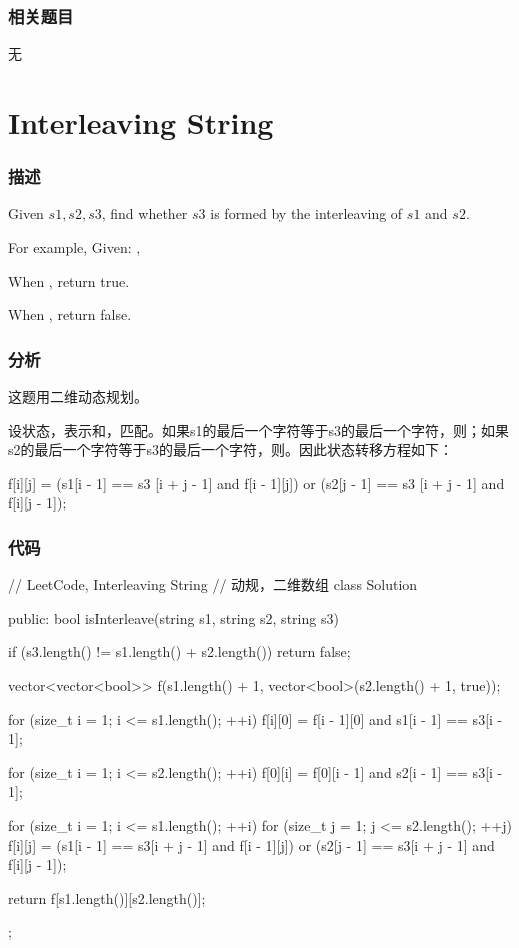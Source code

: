 \subsubsection{相关题目}
\begindot
\item 无
\myenddot


\section{Interleaving String} %
\label{sec:interleaving-string}


\subsubsection{描述}
Given $s1, s2, s3$, find whether $s3$ is formed by the interleaving of $s1$ and $s2$.

For example, Given: ,

When , return true.

When , return false.


\subsubsection{分析}
这题用二维动态规划。

设状态，表示和，匹配。如果s1的最后一个字符等于s3的最后一个字符，则；如果s2的最后一个字符等于s3的最后一个字符，则。因此状态转移方程如下：
\begin{Code}
f[i][j] = (s1[i - 1] == s3 [i + j - 1] and f[i - 1][j])
       or (s2[j - 1] == s3 [i + j - 1] and f[i][j - 1]);
\end{Code}

\subsubsection{代码}
\begin{Code}
// LeetCode, Interleaving String
// 动规，二维数组
class Solution {
public:
    bool isInterleave(string s1, string s2, string s3) {
        if (s3.length() != s1.length() + s2.length())
            return false;

        vector<vector<bool>> f(s1.length() + 1,
                vector<bool>(s2.length() + 1, true));

        for (size_t i = 1; i <= s1.length(); ++i)
            f[i][0] = f[i - 1][0] and s1[i - 1] == s3[i - 1];

        for (size_t i = 1; i <= s2.length(); ++i)
            f[0][i] = f[0][i - 1] and s2[i - 1] == s3[i - 1];

        for (size_t i = 1; i <= s1.length(); ++i)
            for (size_t j = 1; j <= s2.length(); ++j)
                f[i][j] = (s1[i - 1] == s3[i + j - 1] and f[i - 1][j])
                        or (s2[j - 1] == s3[i + j - 1] and f[i][j - 1]);

        return f[s1.length()][s2.length()];
    }
};
\end{Code}

